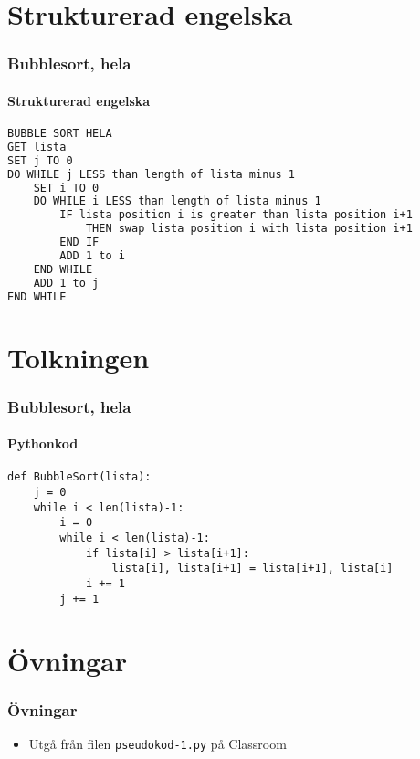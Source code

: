\documentclass[aspectratio=169]{beamer}
\begin{document}
\section{Strukturerad engelska}

\begin{frame}[fragile]
	\frametitle{Bubblesort, hela}
	\framesubtitle{Strukturerad engelska}

\begin{lstlisting}[language=TeX]
BUBBLE SORT HELA
GET lista
SET j TO 0
DO WHILE j LESS than length of lista minus 1
    SET i TO 0
    DO WHILE i LESS than length of lista minus 1
	    IF lista position i is greater than lista position i+1
		    THEN swap lista position i with lista position i+1 
	    END IF
	    ADD 1 to i
    END WHILE
    ADD 1 to j
END WHILE
\end{lstlisting}

\end{frame}

\section{Tolkningen}

\begin{frame}[fragile]
	\frametitle{Bubblesort, hela}
	\framesubtitle{Pythonkod}

\begin{lstlisting}
def BubbleSort(lista):
    j = 0
    while i < len(lista)-1:
        i = 0
        while i < len(lista)-1:
            if lista[i] > lista[i+1]:
                lista[i], lista[i+1] = lista[i+1], lista[i]
            i += 1
        j += 1
\end{lstlisting}

\end{frame}

\section{Övningar}

\begin{frame}
	\frametitle{Övningar}
	
	\begin{itemize}
		\item Utgå från filen \texttt{pseudokod-1.py} på Classroom
	\end{itemize}	

\end{frame}
\end{document}
